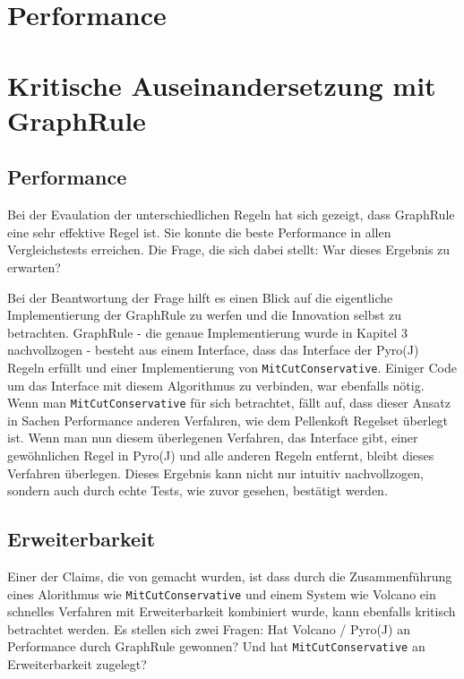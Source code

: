 \section{Performance}



\section{Kritische Auseinandersetzung mit GraphRule}


\subsection{Performance}

Bei der Evaulation der unterschiedlichen Regeln hat sich gezeigt, dass GraphRule eine sehr effektive Regel ist. Sie konnte die beste Performance in allen Vergleichstests erreichen. Die Frage, die sich dabei stellt: War dieses Ergebnis zu erwarten?

Bei der Beantwortung der Frage hilft es einen Blick auf die eigentliche Implementierung der GraphRule zu werfen und die Innovation selbst zu betrachten. GraphRule - die genaue Implementierung wurde in Kapitel 3 nachvollzogen - besteht aus einem Interface, dass das Interface der Pyro(J) Regeln erfüllt und einer Implementierung von \texttt{MitCutConservative}. Einiger Code um das Interface mit diesem Algorithmus zu verbinden, war ebenfalls nötig. Wenn man \texttt{MitCutConservative} für sich betrachtet, fällt auf, dass dieser Ansatz in Sachen Performance anderen Verfahren, wie dem Pellenkoft Regelset überlegt ist. Wenn man nun diesem überlegenen Verfahren, das Interface gibt, einer gewöhnlichen Regel in Pyro(J) und alle anderen Regeln entfernt, bleibt dieses Verfahren überlegen. Dieses Ergebnis kann nicht nur intuitiv nachvollzogen, sondern auch durch echte Tests, wie zuvor gesehen, bestätigt werden.


\subsection{Erweiterbarkeit}

Einer der Claims, die von \cite{} gemacht wurden, ist dass durch die Zusammenführung eines Alorithmus wie \texttt{MitCutConservative} und einem System wie Volcano ein schnelles Verfahren mit Erweiterbarkeit kombiniert wurde, kann ebenfalls kritisch betrachtet werden. Es stellen sich zwei Fragen: Hat Volcano / Pyro(J) an Performance durch GraphRule gewonnen? Und hat \texttt{MitCutConservative} an Erweiterbarkeit zugelegt?


